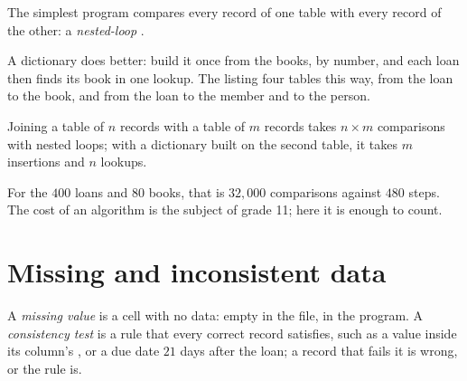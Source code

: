The simplest program compares every record of one table with every record of the other: a \emph{nested-loop }.

\label{lst:g10:data-tables:join-loans}

\label{out:g10:data-tables:join-loans}

A dictionary does better: build it once from the books, by number, and each loan then finds its book in one lookup.
The listing  four tables this way, from the loan to the book, and from the loan to the member and to the person.

\label{lst:g10:data-tables:join-index}

\label{out:g10:data-tables:join-index}

\begin{proposition}\label{prop:g10:data-tables:join-cost}
Joining a table of $n$ records with a table of $m$ records takes $n \times m$ comparisons with nested loops; with a
dictionary built on the second table, it takes $m$ insertions and $n$ lookups.
\end{proposition}

For the $400$ loans and $80$ books, that is $32{,}000$ comparisons against $480$ steps. The cost of an algorithm is
the subject of grade 11; here it is enough to count.

\section{Missing and inconsistent data}\label{sec:g10:data-tables:clean}

\begin{definition}\label{def:g10:data-tables:missing}
A \emph{missing value} is a cell with no data: empty in the file,  in the program.
A \emph{consistency test} is a rule that every correct record satisfies, such as a value
inside its column's , or a due date $21$ days after the loan; a record that fails it is wrong, or the rule is.
\end{definition}

